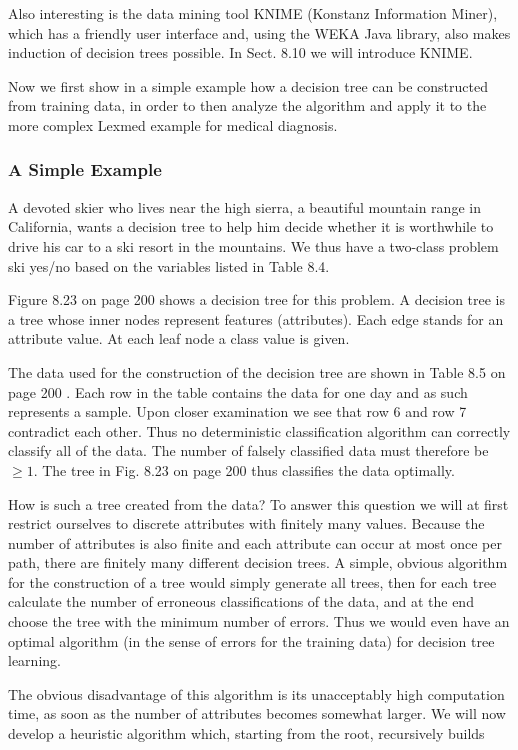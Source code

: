 \documentclass[10pt]{article}
\begin{document}
Also interesting is the data mining tool KNIME (Konstanz Information Miner), which has a friendly user interface and, using the WEKA Java library, also makes induction of decision trees possible. In Sect. 8.10 we will introduce KNIME.

Now we first show in a simple example how a decision tree can be constructed from training data, in order to then analyze the algorithm and apply it to the more complex Lexmed example for medical diagnosis.

\subsubsection*{A Simple Example}
A devoted skier who lives near the high sierra, a beautiful mountain range in California, wants a decision tree to help him decide whether it is worthwhile to drive his car to a ski resort in the mountains. We thus have a two-class problem ski yes/no based on the variables listed in Table 8.4.

Figure 8.23 on page 200 shows a decision tree for this problem. A decision tree is a tree whose inner nodes represent features (attributes). Each edge stands for an attribute value. At each leaf node a class value is given.

The data used for the construction of the decision tree are shown in Table 8.5 on page 200 . Each row in the table contains the data for one day and as such represents a sample. Upon closer examination we see that row 6 and row 7 contradict each other. Thus no deterministic classification algorithm can correctly classify all of the data. The number of falsely classified data must therefore be $\geq 1$. The tree in Fig. 8.23 on page 200 thus classifies the data optimally.

How is such a tree created from the data? To answer this question we will at first restrict ourselves to discrete attributes with finitely many values. Because the number of attributes is also finite and each attribute can occur at most once per path, there are finitely many different decision trees. A simple, obvious algorithm for the construction of a tree would simply generate all trees, then for each tree calculate the number of erroneous classifications of the data, and at the end choose the tree with the minimum number of errors. Thus we would even have an optimal algorithm (in the sense of errors for the training data) for decision tree learning.

The obvious disadvantage of this algorithm is its unacceptably high computation time, as soon as the number of attributes becomes somewhat larger. We will now develop a heuristic algorithm which, starting from the root, recursively builds
\end{document}
